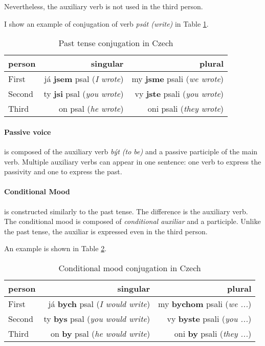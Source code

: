Nevertheless, the auxiliary verb is not used in the third person.

I show an example of conjugation of verb \emph{psát (write)} in Table \ref{tab:past-tense-conj}.

\begin{table}[!ht]
	\caption{Past tense conjugation in Czech}
	\label{tab:past-tense-conj}
	\begin{center}
		\begin{tabular}{l|r|r}
			person & singular & plural \\
			\hline
			First & já \textbf{jsem} psal (\emph{I wrote}) & my \textbf{jsme} psali (\emph{we wrote}) \\
			Second & ty \textbf{jsi} psal (\emph{you wrote}) & vy \textbf{jste} psali (\emph{you wrote})  \\
			Third & on psal (\emph{he wrote}) & oni psali (\emph{they wrote})  \\
		\end{tabular}
	\end{center}
\end{table}

\paragraph{Passive voice} is composed of the auxiliary verb \emph{být (to be)} and a passive participle of the main verb. Multiple auxiliary verbs can appear in one sentence: one verb to express the passivity and one to express the past.

\paragraph{Conditional Mood} is constructed similarly to the past tense. The difference is the auxiliary verb. The conditional mood is composed of \emph{conditional auxiliar} and a participle. Unlike the past tense, the auxiliar is expressed even in the third person.

An example is shown in Table \ref{tab:cond}.

\begin{table}[!ht]
	\caption{Conditional mood conjugation in Czech}
	\label{tab:cond}
	\begin{center}
		\begin{tabular}{l|r|r}
			person & singular & plural \\
			\hline
			First & já \textbf{bych} psal (\emph{I would write}) & my \textbf{bychom} psali (\emph{we ...}) \\
			Second & ty \textbf{bys} psal (\emph{you would write}) & vy \textbf{byste} psali (\emph{you ...})  \\
			Third & on \textbf{by} psal (\emph{he would write}) & oni \textbf{by} psali (\emph{they ...})  \\
		\end{tabular}
	\end{center}
\end{table}

